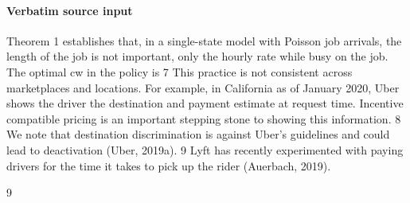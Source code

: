 \documentclass[10pt]{article}
\begin{document}
\paragraph{Verbatim source input}
\begin{ReviewVerbatim}
Theorem 1 establishes that, in a single-state model with Poisson job arrivals, the length of the
job is not important, only the hourly rate while busy on the job. The optimal cw in the policy is
7
This practice is not consistent across marketplaces and locations. For example, in California as of January 2020,
Uber shows the driver the destination and payment estimate at request time. Incentive compatible pricing is an
important stepping stone to showing this information.
8
We note that destination discrimination is against Uber’s guidelines and could lead to deactivation (Uber, 2019a).
9
Lyft has recently experimented with paying drivers for the time it takes to pick up the rider (Auerbach, 2019).

9



\end{ReviewVerbatim}
\end{document}
